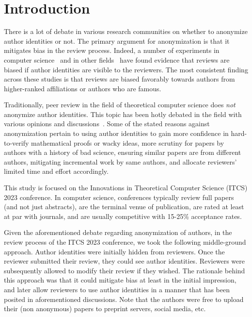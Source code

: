 \documentclass{article}
\begin{document}
\section{Introduction}
\label{SecIntro} 

There is a lot of debate in various research communities on whether to anonymize author identities or not. The primary argument for anonymization is that it mitigates bias in the review process. Indeed, a number of experiments in computer science~\cite{tomkins2017reviewer,manzoor2020uncovering} and in other fields~\cite{okike2016single,blank1991effects,ross2006effect,garfunkel1994effect,fisher1994effects,huber2022nobel} have found evidence that reviews are biased if author identities are visible to the reviewers. The most consistent finding across these studies is that reviews are biased favorably towards authors from higher-ranked affiliations or authors who are famous. 

Traditionally, peer review in the field of theoretical computer science does \emph{not} anonymize author identities. This topic has been hotly debated in the field with various opinions and discussions~\cite{Fortnow2018,Barak_2018,Venkatasubramanian_2018,Reingold_2018,Mitzenmacher_2018}. Some of the stated reasons against anonymization pertain to using author identities to gain more confidence in hard-to-verify mathematical proofs or wacky ideas, more scrutiny for papers by authors with a history of bad science, ensuring similar papers are from different authors, mitigating incremental work by same authors, and allocate reviewers' limited time and effort accordingly. 

This study is focused on the Innovations in Theoretical Computer Science (ITCS) 2023 conference. In computer science, conferences typically review full papers (and not just abstracts), are the terminal venue of publication, are rated at least at par with journals, and are usually competitive with 15-25\% acceptance rates.

Given the aforementioned debate regarding anonymization of authors, in the review process of the ITCS 2023 conference, we took the following middle-ground approach. Author identities were initially hidden from reviewers. Once the reviewer submitted their review, they could see author identities. Reviewers were subsequently allowed to modify their review if they wished. The rationale behind this approach was that it could mitigate bias at least in the initial impression, and later allow reviewers to use author identities in a manner that has been posited in aforementioned discussions. Note that the authors were free to upload their (non anonymous) papers to preprint servers, social media, etc.
\end{document}
